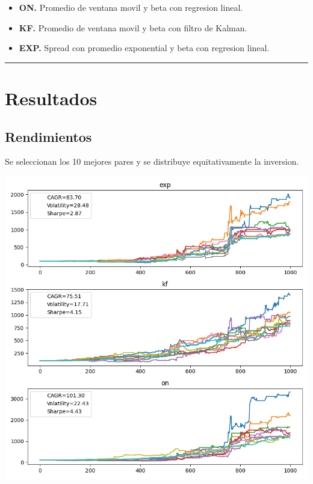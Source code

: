 \documentclass{myarticle}
\begin{document}
\begin{itemize}
\item \textbf{ON.} Promedio de ventana movil y beta con regresion lineal.

\item \textbf{KF.} Promedio de ventana movil y beta con filtro de Kalman.

\item \textbf{EXP.} Spread con promedio exponential y beta con regresion lineal.
\end{itemize}






\noindent\rule{\textwidth}{0.5pt}
\section{Resultados}
\label{sec:orgc2f7bae}

\subsection{Rendimientos}
\label{sec:org222723b}

Se seleccionan los 10 mejores pares y se distribuye equitativamente la inversion.

\begin{center}
\includegraphics[width=.9\linewidth]{./fig/compara_capital_best_pairs.png}
\end{center}
\end{document}

